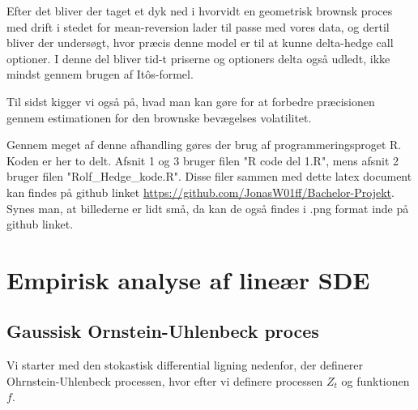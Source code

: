 \documentclass{article}
\theoremstyle{definition}
\theoremstyle{remark}
\begin{document}
Efter det bliver der taget et dyk ned i hvorvidt en geometrisk brownsk proces med drift i stedet for mean-reversion lader til passe med vores data, og dertil bliver der undersøgt, hvor præcis denne model er til at kunne delta-hedge call optioner. I denne del bliver tid-t priserne og optioners delta også udledt, ikke mindst gennem brugen af Itôs-formel.

Til sidst kigger vi også på, hvad man kan gøre for at forbedre præcisionen gennem estimationen for den brownske bevægelses volatilitet.

Gennem meget af denne afhandling gøres der brug af programmeringsproget R. Koden er her to delt. Afsnit 1 og 3 bruger filen "R code del 1.R", mens afsnit 2 bruger filen "Rolf\_Hedge\_kode.R". Disse filer sammen med dette latex document kan findes på github linket \href{https://github.com/JonasW01ff/Bachelor-Projekt}{https://github.com/JonasW01ff/Bachelor-Projekt}. Synes man, at billederne er lidt små, da kan de også findes i .png format inde på github linket.
\newpage
\section{Empirisk analyse af lineær SDE}
\subsection{Gaussisk Ornstein-Uhlenbeck proces}
Vi starter med den stokastisk differential ligning nedenfor, der definerer Ohrnstein-Uhlenbeck processen, hvor efter vi definere processen $Z_t$ og funktionen $f$.
\end{document}
